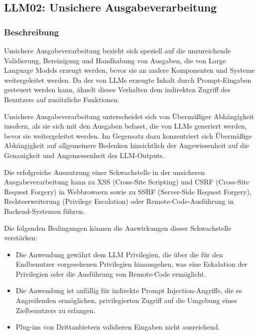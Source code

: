 \documentclass[
]{article}
\author{}
\date{}
\providecommand{\tightlist}{%
  \setlength{\itemsep}{0pt}\setlength{\parskip}{0pt}}
\begin{document}
\subsection{LLM02: Unsichere
Ausgabeverarbeitung}\label{llm02-unsichere-ausgabeverarbeitung}

\subsubsection{Beschreibung}\label{beschreibung}

Unsichere Ausgabeverarbeitung bezieht sich speziell auf die
unzureichende Validierung, Bereinigung und Handhabung von Ausgaben, die
von Large Language Models erzeugt werden, bevor sie an andere
Komponenten und Systeme weitergeleitet werden. Da der von LLMs erzeugte
Inhalt durch Prompt-Eingaben gesteuert werden kann, ähnelt dieses
Verhalten dem indirekten Zugriff des Benutzers auf zusätzliche
Funktionen.

Unsichere Ausgabeverarbeitung unterscheidet sich von Übermäßiger
Abhängigkeit insofern, als sie sich mit den Ausgaben befasst, die von
LLMs generiert werden, bevor sie weitergeleitet werden. Im Gegensatz
dazu konzentriert sich Übermäßige Abhängigkeit auf allgemeinere Bedenken
hinsichtlich der Angewiesenheit auf die Genauigkeit und Angemessenheit
des LLM-Outputs.

Die erfolgreiche Ausnutzung einer Schwachstelle in der unsicheren
Ausgabeverarbeitung kann zu XSS (Cross-Site Scripting) und CSRF
(Cross-Site Request Forgery) in Webbrowsern sowie zu SSRF (Server-Side
Request Forgery), Rechteerweiterung (Privilege Escalation) oder
Remote-Code-Ausführung in Backend-Systemen führen.

Die folgenden Bedingungen können die Auswirkungen dieser Schwachstelle
verstärken:

\begin{itemize}
\tightlist
\item
  Die Anwendung gewährt dem LLM Privilegien, die über die für den
  Endbenutzer vorgesehenen Privilegien hinausgehen, was eine Eskalation
  der Privilegien oder die Ausführung von Remote-Code ermöglicht.
\item
  Die Anwendung ist anfällig für indirekte Prompt Injection-Angriffe,
  die es Angreifenden ermöglichen, privilegierten Zugriff auf die
  Umgebung eines Zielbenutzers zu erlangen.
\item
  Plug-ins von Drittanbietern validieren Eingaben nicht ausreichend.
\end{itemize}
\end{document}
